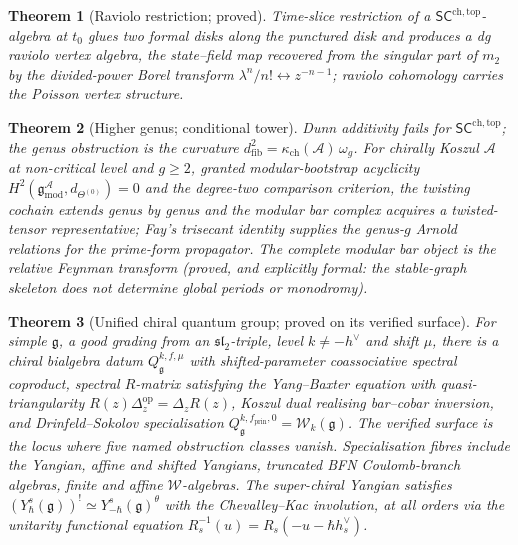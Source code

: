 \documentclass[11pt]{article}
\providecommand{\cA}{\mathcal{A}}
\providecommand{\cW}{\mathcal{W}}
\providecommand{\fg}{\mathfrak{g}}
\providecommand{\fsl}{\mathfrak{sl}}
\providecommand{\kch}{\kappa_{\mathrm{ch}}}
\providecommand{\SCchtop}{\mathsf{SC}^{\mathrm{ch,top}}}
\newtheorem{theorem}{Theorem}[section]
\begin{document}
\begin{theorem}[Raviolo restriction; proved]\label{thm:raviolo}
Time-slice restriction of a $\SCchtop$-algebra at $t_0$ glues two
formal disks along the punctured disk and produces a dg raviolo vertex
algebra, the state--field map recovered from the singular part of $m_2$
by the divided-power Borel transform
$\lambda^n/n!\leftrightarrow z^{-n-1}$; raviolo cohomology carries the
Poisson vertex structure.
\end{theorem}

\begin{theorem}[Higher genus; conditional tower]\label{thm:genus}
Dunn additivity fails for $\SCchtop$; the genus obstruction is the
curvature $d_{\mathrm{fib}}^2=\kch(\cA)\,\omega_g$. For chirally Koszul
$\cA$ at non-critical level and $g\ge2$, granted modular-bootstrap
acyclicity $H^2(\fg^{\cA}_{\mathrm{mod}},d_{\Theta^{(0)}})=0$ and the
degree-two comparison criterion, the twisting cochain extends genus by
genus and the modular bar complex acquires a twisted-tensor
representative; Fay's trisecant identity supplies the genus-$g$ Arnold
relations for the prime-form propagator. The complete modular bar
object \emph{is} the relative Feynman transform
\textup{(proved, and explicitly formal: the stable-graph skeleton does
not determine global periods or monodromy)}.
\end{theorem}

\begin{theorem}[Unified chiral quantum group; proved on its verified
surface]\label{thm:ucqg}
For simple $\fg$, a good grading from an $\fsl_2$-triple, level
$k\neq-h^\vee$ and shift $\mu$, there is a chiral bialgebra datum
$Q^{k,f,\mu}_{\fg}$ with shifted-parameter coassociative spectral
coproduct, spectral $R$-matrix satisfying the Yang--Baxter equation
with quasi-triangularity $R(z)\Delta^{\mathrm{op}}_z=\Delta_zR(z)$,
Koszul dual realising bar--cobar inversion, and Drinfeld--Sokolov
specialisation $Q^{k,f_{\mathrm{prin}},0}_{\fg}=\cW_k(\fg)$. The
verified surface is the locus where five named obstruction classes
vanish. Specialisation fibres include the Yangian, affine and shifted
Yangians, truncated BFN Coulomb-branch algebras, finite and affine
$\cW$-algebras. The super-chiral Yangian satisfies
$(Y^s_\hbar(\fg))^!\simeq Y^s_{-\hbar}(\fg)^\theta$ with the
Chevalley--Kac involution, at all orders via the unitarity functional
equation $R_s^{-1}(u)=R_s(-u-\hbar h^\vee_s)$.
\end{theorem}
\end{document}
